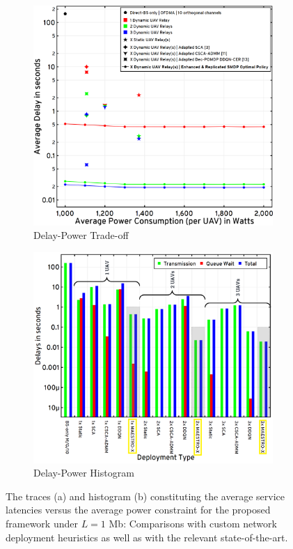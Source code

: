 \documentclass[12pt, draftcls, onecolumn]{IEEEtran}
\theoremstyle{plain}
\theoremstyle{definition}
\theoremstyle{remark}
\begin{document}
\begin{figure} [t]
     \begin{subfigure}{0.493\linewidth}
         \centering
         \includegraphics[width=0.9\linewidth]{figs/Delay_Power_Tradeoff_1Mb.png}
         \caption{Delay-Power Trade-off}
         \label{F8}
     \end{subfigure}
     \begin{subfigure}{0.507\linewidth}
         \centering
         \includegraphics[width=0.9\linewidth]{figs/Delay_Power_Histogram_1Mb.png}
         \caption{Delay-Power Histogram}
         \label{F9}
     \end{subfigure}
     \caption{The traces (a) and histogram (b) constituting the average service latencies versus the average power constraint for the proposed framework under $L{=}1$ Mb: Comparisons with custom network deployment heuristics as well as with the relevant state-of-the-art.}
     \label{F8andF9}
     \vspace{-10mm}
\end{figure}
\end{document}
